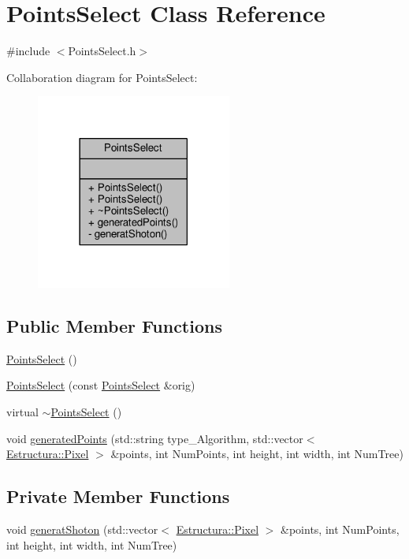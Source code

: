 \hypertarget{classPointsSelect}{}\section{Points\+Select Class Reference}
\label{classPointsSelect}


{\ttfamily \#include $<$Points\+Select.\+h$>$}



Collaboration diagram for Points\+Select\+:
\nopagebreak
\begin{figure}[H]
\begin{center}
\leavevmode
\includegraphics[width=182pt]{classPointsSelect__coll__graph}
\end{center}
\end{figure}
\subsection*{Public Member Functions}
\begin{DoxyCompactItemize}
\item 
\hyperlink{classPointsSelect_add4419dcb7bd7cbe7d8cebbed3b224f5}{Points\+Select} ()
\item 
\hyperlink{classPointsSelect_a78613447513329afc720a9023fff3b03}{Points\+Select} (const \hyperlink{classPointsSelect}{Points\+Select} \&orig)
\item 
virtual \hyperlink{classPointsSelect_a017becb18c1d21eb01f6dc9ffd9461a5}{$\sim$\+Points\+Select} ()
\item 
void \hyperlink{classPointsSelect_a1c487676ff7dc9a8cfd7dbae206a04ae}{generated\+Points} (std\+::string type\+\_\+\+Algorithm, std\+::vector$<$ \hyperlink{structEstructura_1_1Pixel}{Estructura\+::\+Pixel} $>$ \&points, int Num\+Points, int height, int width, int Num\+Tree)
\end{DoxyCompactItemize}
\subsection*{Private Member Functions}
\begin{DoxyCompactItemize}
\item 
void \hyperlink{classPointsSelect_a5b0f15db86a3c16f0e8d6587099d0a9b}{generat\+Shoton} (std\+::vector$<$ \hyperlink{structEstructura_1_1Pixel}{Estructura\+::\+Pixel} $>$ \&points, int Num\+Points, int height, int width, int Num\+Tree)
\end{DoxyCompactItemize}


